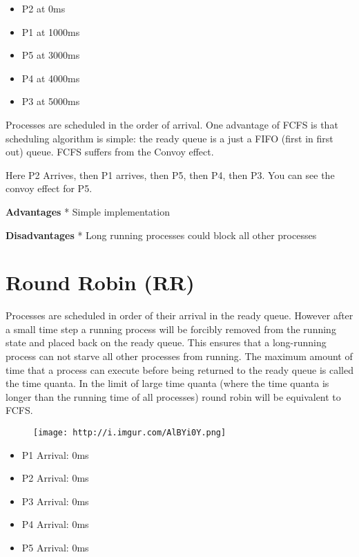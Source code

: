 \begin{itemize}
\tightlist
\item
  P2 at 0ms
\item
  P1 at 1000ms
\item
  P5 at 3000ms
\item
  P4 at 4000ms
\item
  P3 at 5000ms
\end{itemize}

Processes are scheduled in the order of arrival. One advantage of FCFS
is that scheduling algorithm is simple: the ready queue is a just a FIFO
(first in first out) queue. FCFS suffers from the Convoy effect.

Here P2 Arrives, then P1 arrives, then P5, then P4, then P3. You can see
the convoy effect for P5.

\textbf{Advantages} * Simple implementation

\textbf{Disadvantages} * Long running processes could block all other
processes

\section{Round Robin (RR)}\label{round-robin-rr}

Processes are scheduled in order of their arrival in the ready queue.
However after a small time step a running process will be forcibly
removed from the running state and placed back on the ready queue. This
ensures that a long-running process can not starve all other processes
from running. The maximum amount of time that a process can execute
before being returned to the ready queue is called the time quanta. In
the limit of large time quanta (where the time quanta is longer than the
running time of all processes) round robin will be equivalent to FCFS.

\begin{figure}[htbp]
\centering
\texttt{[image: http://i.imgur.com/AlBYi0Y.png]}
\caption{}
\end{figure}

\begin{itemize}
\tightlist
\item
  P1 Arrival: 0ms
\item
  P2 Arrival: 0ms
\item
  P3 Arrival: 0ms
\item
  P4 Arrival: 0ms
\item
  P5 Arrival: 0ms
\end{itemize}


